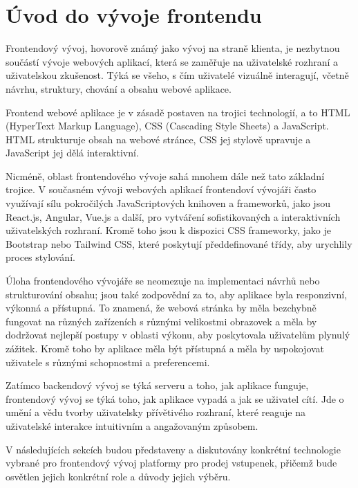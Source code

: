 \section{Úvod do vývoje frontendu}
\label{sec:implementace-uvod}
Frontendový vývoj, hovorově známý jako vývoj na straně klienta, je nezbytnou součástí vývoje webových aplikací, která se zaměřuje na uživatelské rozhraní a uživatelskou zkušenost.
Týká se všeho, s čím uživatelé vizuálně interagují, včetně návrhu, struktury, chování a obsahu webové aplikace.

Frontend webové aplikace je v zásadě postaven na trojici technologií, a to HTML (HyperText Markup Language), CSS (Cascading Style Sheets) a JavaScript.
HTML strukturuje obsah na webové stránce, CSS jej stylově upravuje a JavaScript jej dělá interaktivní.

Nicméně, oblast frontendového vývoje sahá mnohem dále než tato základní trojice.
V současném vývoji webových aplikací frontendoví vývojáři často využívají sílu pokročilých JavaScriptových knihoven a frameworků, jako jsou React.js, Angular, Vue.js a další, pro vytváření sofistikovaných a interaktivních uživatelských rozhraní.
Kromě toho jsou k dispozici CSS frameworky, jako je Bootstrap nebo Tailwind CSS, které poskytují předdefinované třídy, aby urychlily proces stylování.

Úloha frontendového vývojáře se neomezuje na implementaci návrhů nebo strukturování obsahu; jsou také zodpovědní za to, aby aplikace byla responzivní, výkonná a přístupná.
To znamená, že webová stránka by měla bezchybně fungovat na různých zařízeních s různými velikostmi obrazovek a měla by dodržovat nejlepší postupy v oblasti výkonu, aby poskytovala uživatelům plynulý zážitek.
Kromě toho by aplikace měla být přístupná a měla by uspokojovat uživatele s různými schopnostmi a preferencemi.

Zatímco backendový vývoj se týká serveru a toho, jak aplikace funguje, frontendový vývoj se týká toho, jak aplikace vypadá a jak se uživatel cítí.
Jde o umění a vědu tvorby uživatelsky přívětivého rozhraní, které reaguje na uživatelské interakce intuitivním a angažovaným způsobem.

V následujících sekcích budou představeny a diskutovány konkrétní technologie vybrané pro frontendový vývoj platformy pro prodej vstupenek, přičemž bude osvětlen jejich konkrétní role a důvody jejich výběru.
